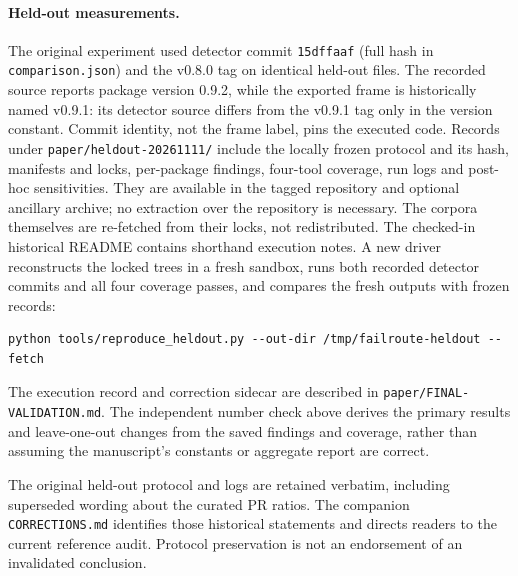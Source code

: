 \documentclass[10pt,a4paper]{article}
\begin{document}
\paragraph{Held-out measurements.}
The original experiment used detector commit
\texttt{15dffaaf} (full hash in \texttt{comparison.json}) and the v0.8.0 tag on
identical held-out files. The recorded source reports package version 0.9.2,
while the exported frame is historically named v0.9.1: its detector source
differs from the v0.9.1 tag only in the version constant. Commit identity,
not the frame label, pins the executed code. Records under \texttt{paper/heldout-20261111/}
include the locally frozen protocol and its hash, manifests and locks,
per-package findings, four-tool coverage, run logs and post-hoc sensitivities.
They are available in the tagged repository and optional ancillary archive;
no extraction over the repository is necessary. The corpora themselves are
re-fetched from their locks, not redistributed. The checked-in historical
README contains shorthand execution notes. A new driver reconstructs the
locked trees in a fresh sandbox, runs both recorded detector commits and all
four coverage passes, and compares the fresh outputs with frozen records:
\begin{verbatim}
python tools/reproduce_heldout.py --out-dir /tmp/failroute-heldout --fetch
\end{verbatim}
The execution record and correction sidecar are described in
\texttt{paper/FINAL-VALIDATION.md}.
The independent number check above derives the primary results and
leave-one-out changes from the saved findings and coverage, rather than
assuming the manuscript's constants or aggregate report are correct.

The original held-out protocol and logs are retained verbatim, including
superseded wording about the curated PR ratios. The companion
\texttt{CORRECTIONS.md} identifies those historical statements and directs
readers to the current reference audit. Protocol preservation is not an
endorsement of an invalidated conclusion.
\end{document}
